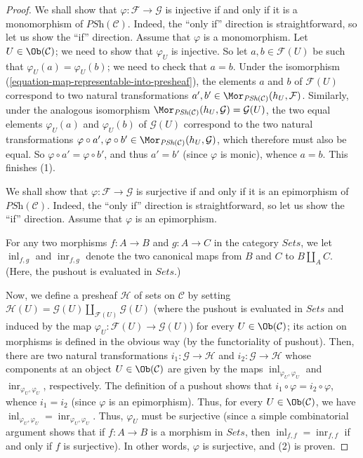 \begin{proof}
We shall show that $\varphi : \mathcal{F} \to
\mathcal{G}$ is injective if and only if it is a monomorphism
of $\textit{PSh}(\mathcal{C})$. Indeed, the ``only if''
direction is straightforward, so let us show the ``if''
direction. Assume that $\varphi$ is a monomorphism. Let
$U \in \Ob(\mathcal{C})$; we need to show that $\varphi_U$ is
injective. So let $a, b \in \mathcal{F}(U)$ be such that
$\varphi_U (a) = \varphi_U (b)$; we need to check that $a = b$.
Under the isomorphism
(\ref{equation-map-representable-into-presheaf}), the elements
$a$ and $b$ of $\mathcal{F}(U)$ correspond to two natural
transformations
$a', b' \in \Mor_{\textit{PSh}(\mathcal{C})}(h_U, \mathcal{F})$.
Similarly, under the analogous isomorphism
$\Mor_{\textit{PSh}(\mathcal{C})}(h_U, \mathcal{G})
= \mathcal{G}(U)$,
the two equal elements $\varphi_U (a)$ and $\varphi_U (b)$ of
$\mathcal{G}(U)$ correspond to the two natural transformations
$\varphi \circ a', \varphi \circ b'
\in \Mor_{\textit{PSh}(\mathcal{C})}(h_U, \mathcal{G})$,
which therefore must also be equal. So
$\varphi \circ a' = \varphi \circ b'$, and thus $a' = b'$
(since $\varphi$ is monic), whence $a = b$. This finishes (1).

\medskip\noindent
We shall show that $\varphi : \mathcal{F} \to
\mathcal{G}$ is surjective if and only if it is an epimorphism
of $\textit{PSh}(\mathcal{C})$. Indeed, the ``only if''
direction is straightforward, so let us show the ``if''
direction. Assume that $\varphi$ is an epimorphism.

\medskip\noindent
For any two morphisms $f : A \to B$ and $g : A \to C$ in the
category $\textit{Sets}$, we let $\operatorname{inl}_{f,g}$ and
$\operatorname{inr}_{f,g}$ denote the two canonical maps from
$B$ and $C$ to $B \coprod_A C$. (Here, the pushout is
evaluated in $\textit{Sets}$.)

\medskip\noindent
Now, we define a presheaf $\mathcal{H}$ of sets on $\mathcal{C}$
by setting $\mathcal{H}(U)
= \mathcal{G}(U) \coprod_{\mathcal{F}(U)} \mathcal{G}(U)$ (where
the pushout is evaluated in $\textit{Sets}$ and induced by
the map $\varphi_U : \mathcal{F}(U) \to \mathcal{G}(U)$) for
every $U \in \Ob(\mathcal{C})$; its action on morphisms is
defined in the obvious way (by the functoriality of pushout).
Then, there are two natural
transformations $i_1 : \mathcal{G} \to \mathcal{H}$ and
$i_2 : \mathcal{G} \to \mathcal{H}$ whose components at an object
$U \in \Ob(\mathcal{C})$ are given by the maps
$\operatorname{inl}_{\varphi_U, \varphi_U}$ and
$\operatorname{inr}_{\varphi_U, \varphi_U}$, respectively. The
definition of a pushout shows that $i_1 \circ \varphi
= i_2 \circ \varphi$, whence $i_1 = i_2$ (since $\varphi$ is an
epimorphism). Thus, for every $U \in \Ob(\mathcal{C})$, we have
$\operatorname{inl}_{\varphi_U, \varphi_U}
= \operatorname{inr}_{\varphi_U, \varphi_U}$. Thus, $\varphi_U$
must be surjective (since a simple combinatorial argument shows
that if $f : A \to B$ is a morphism in $\textit{Sets}$, then
$\operatorname{inl}_{f,f} = \operatorname{inr}_{f,f}$ if and
only if $f$ is surjective). In other words, $\varphi$ is
surjective, and (2) is proven.


\end{proof}
